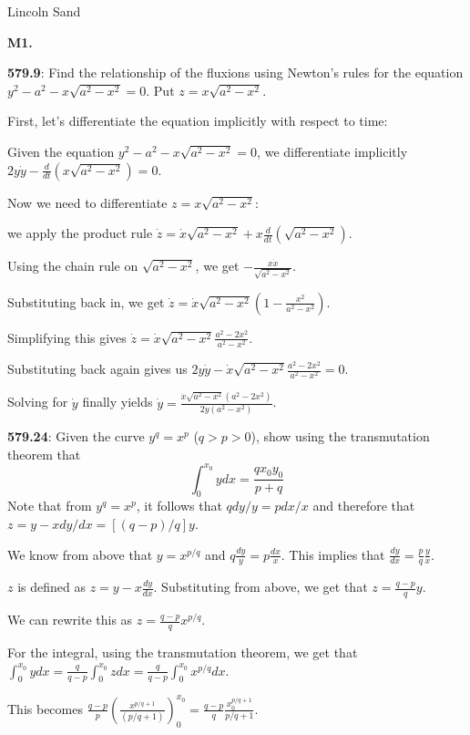 \documentclass{article}
\begin{document}
\Large{Lincoln Sand}


\textbf{M1.}

\textbf{579.9}: Find the relationship of the fluxions using Newton's
rules for the equation $y^2 - a^2 - x \sqrt{a^2 - x^2} = 0$.
Put $z = x \sqrt{a^2 - x^2}$.

First, let's differentiate the equation implicitly with respect to time:

Given the equation $y^2 - a^2 - x \sqrt{a^2 - x^2} = 0$,
we differentiate implicitly $2 y \dot{y} - \frac{d}{dt}(x \sqrt{a^2 - x^2}) = 0$.

Now we need to differentiate $z = x \sqrt{a^2 - x^2}$:

we apply the product rule $\dot{z} = \dot{x} \sqrt{a^2 - x^2} + x \frac{d}{dt}(\sqrt{a^2 - x^2})$.

Using the chain rule on $\sqrt{a^2 - x^2}$, we get $- \frac{x \dot{x}}{\sqrt{a^2 - x^2}}$.

Substituting back in, we get $\dot{z} = \dot{x} \sqrt{a^2 - x^2} \left(1 - \frac{x^2}{a^2 - x^2}\right)$.

Simplifying this gives $\dot{z} = \dot{x} \sqrt{a^2 - x^2} \frac{a^2 - 2x^2}{a^2 - x^2}$.

Substituting back again gives us $2 y \dot{y} - \dot{x} \sqrt{a^2 - x^2} \frac{a^2 - 2x^2}{a^2 - x^2} = 0$.

Solving for $\dot{y}$ finally yields $\dot{y} = \frac{\dot{x} \sqrt{a^2 - x^2} (a^2 - 2x^2)}{2y(a^2 - x^2)}$.


\textbf{579.24}: Given the curve $y^q = x^p$ ($q > p > 0$),
show using the transmutation theorem that
\[\int_{0}^{x_0} y dx = \frac{q x_0 y_0}{p+q}\]
Note that from $y^q = x^p$, it follows that $q dy/y = p dx/x$ and
therefore that $z = y - x dy/dx = [(q-p)/q]y$.

We know from above that $y = x^{p/q}$ and $q \frac{dy}{y} = p \frac{dx}{x}$.
This implies that $\frac{dy}{dx} = \frac{p}{q} \frac{y}{x}$.

$z$ is defined as $z = y - x \frac{dy}{dx}$. Substituting from above, we get that
$z = \frac{q-p}{q} y$.

We can rewrite this as $z = \frac{q-p}{q} x^{p/q}$.

For the integral, using the transmutation theorem, we get that
$\int_{0}^{x_0} y dx = \frac{q}{q-p} \int_{0}^{x_0} z dx = \frac{q}{q-p} \int_{0}^{x_0} x^{p/q} dx$.

This becomes $\frac{q-p}{p} \left(\frac{x^{p/q + 1}}{(p/q + 1)}\right)_{0}^{x_0} = \frac{q-p}{q} \frac{x_0^{p/q + 1}}{p/q + 1}$.
\end{document}
